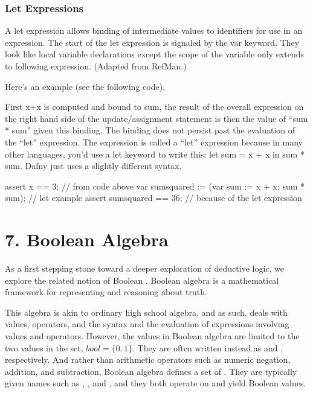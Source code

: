 \documentclass[letterpaper,10pt,english]{sphinxmanual}
\begin{document}
\subsection{Let Expressions}
\label{\detokenize{06-dafny-language:let-expressions}}
A let expression allows binding of intermediate values to identifiers
for use in an expression. The start of the let expression is signaled
by the var keyword. They look like local variable declarations except
the scope of the variable only extends to following
expression. (Adapted from RefMan.)

Here’s an example (see the following code).

First x+x is computed and bound to sum, the result of the overall
expression on the right hand side of the update/assignment statement
is then the value of “sum * sum” given this binding. The binding does
not persist past the evaluation of the “let” expression.  The
expression is called a “let” expression because in many other
languages, you’d use a let keyword to write this: let sum = x + x in
sum * sum. Dafny just uses a slightly different syntax.

\begin{sphinxVerbatim}[commandchars=\\\{\}]
assert x == 3;               // from code above
var sumsquared := (var sum := x + x; sum * sum);  // let example
assert sumsquared == 36;     // because of the let expression
\end{sphinxVerbatim}


\chapter{7. Boolean Algebra}
\label{\detokenize{07-boolean-algebra::doc}}\label{\detokenize{07-boolean-algebra:boolean-algebra}}
As a first stepping stone toward a deeper exploration of deductive
logic, we explore the related notion of Boolean . Boolean
algebra is a mathematical framework for representing and reasoning
about truth.

This algebra is akin to ordinary high school algebra, and as such,
deals with values, operators, and the syntax and the evaluation of
expressions involving values and operators.  However, the values in
Boolean algebra are limited to the two values in the set, \(bool
= \{ 0, 1\}\). They are often written instead as  and ,
respectively. And rather than arithmetic operators such as numeric
negation, addition, and subtraction, Boolean algebra defines a set of
. They are typically given names such as ,
, and , and they both operate on and yield Boolean values.
\end{document}

